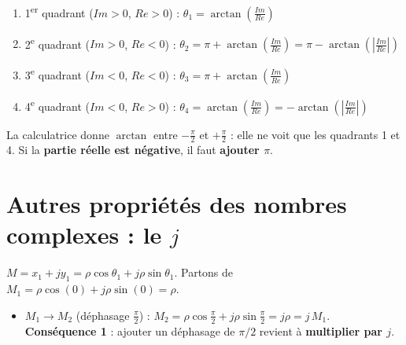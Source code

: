 \begin{thmbox}[title=Argument selon le quadrant]
\begin{enumerate}
  \item 1\textsuperscript{er} quadrant ($Im>0$, $Re>0$) :
        $\theta_1 = \arctan\left(\frac{Im}{Re}\right)$
  \item 2\textsuperscript{e} quadrant ($Im>0$, $Re<0$) :
        $\theta_2 = \pi + \arctan\left(\frac{Im}{Re}\right) = \pi - \arctan\left(\left|\frac{Im}{Re}\right|\right)$
  \item 3\textsuperscript{e} quadrant ($Im<0$, $Re<0$) :
        $\theta_3 = \pi + \arctan\left(\frac{Im}{Re}\right)$
  \item 4\textsuperscript{e} quadrant ($Im<0$, $Re>0$) :
        $\theta_4 = \arctan\left(\frac{Im}{Re}\right) = -\arctan\left(\left|\frac{Im}{Re}\right|\right)$
\end{enumerate}
\end{thmbox}

\begin{warnbox}[title=Le piège]
La calculatrice donne $\arctan$ entre $-\frac\pi2$ et $+\frac\pi2$ : elle ne voit que les
quadrants 1 et 4. Si la \textbf{partie réelle est négative}, il faut \textbf{ajouter $\pi$}.
\end{warnbox}

\section{Autres propriétés des nombres complexes : le $j$}


\begin{thmbox}[title=Multiplier par $j$ = tourner de $\pi/2$]
$M = x_1 + j y_1 = \rho\cos\theta_1 + j\rho\sin\theta_1$. Partons de
$M_1 = \rho\cos(0) + j\rho\sin(0) = \rho$.
\begin{itemize}
  \item $M_1 \to M_2$ (déphasage $\frac\pi2$) :
        $M_2 = \rho\cos\frac\pi2 + j\rho\sin\frac\pi2 = j\rho = j\,M_1$.
        \textbf{Conséquence 1} : ajouter un déphasage de $\pi/2$ revient à
        \textbf{multiplier par $j$}.
\end{itemize}
\end{thmbox}


